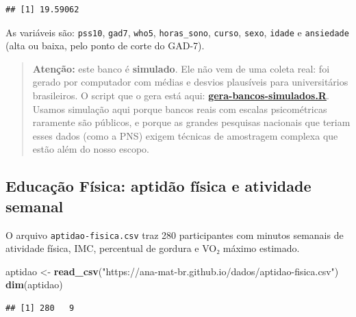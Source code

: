 \documentclass[
]{book}
\newenvironment{Shaded}{\begin{snugshade}}{\end{snugshade}}
\newcommand{\CommentTok}[1]{\textcolor[rgb]{0.56,0.35,0.01}{\textit{#1}}}
\newcommand{\FunctionTok}[1]{\textcolor[rgb]{0.13,0.29,0.53}{\textbf{#1}}}
\newcommand{\NormalTok}[1]{#1}
\newcommand{\OtherTok}[1]{\textcolor[rgb]{0.56,0.35,0.01}{#1}}
\newcommand{\SpecialCharTok}[1]{\textcolor[rgb]{0.81,0.36,0.00}{\textbf{#1}}}
\newcommand{\StringTok}[1]{\textcolor[rgb]{0.31,0.60,0.02}{#1}}
\begin{document}
\begin{verbatim}
## [1] 19.59062
\end{verbatim}

As variáveis são: \texttt{pss10}, \texttt{gad7}, \texttt{who5}, \texttt{horas\_sono}, \texttt{curso}, \texttt{sexo}, \texttt{idade} e \texttt{ansiedade} (alta ou baixa, pelo ponto de corte do GAD-7).

\begin{quote}
\textbf{Atenção:} este banco é \textbf{simulado}. Ele não vem de uma coleta real: foi gerado por computador com médias e desvios plausíveis para universitários brasileiros. O script que o gera está aqui: \href{https://ana-mat-br.github.io/scripts/gera-bancos-simulados.R}{\textbf{gera-bancos-simulados.R}}. Usamos simulação aqui porque bancos reais com escalas psicométricas raramente são públicos, e porque as grandes pesquisas nacionais que teriam esses dados (como a PNS) exigem técnicas de amostragem complexa que estão além do nosso escopo.
\end{quote}

\subsection{Educação Física: aptidão física e atividade semanal}\label{educauxe7uxe3o-fuxedsica-aptiduxe3o-fuxedsica-e-atividade-semanal}

O arquivo \texttt{aptidao-fisica.csv} traz 280 participantes com minutos semanais de atividade física, IMC, percentual de gordura e VO₂ máximo estimado.

\begin{Shaded}
\begin{Highlighting}[]
\NormalTok{aptidao }\OtherTok{\textless{}{-}} \FunctionTok{read\_csv}\NormalTok{(}\StringTok{"https://ana{-}mat{-}br.github.io/dados/aptidao{-}fisica.csv"}\NormalTok{)}
\FunctionTok{dim}\NormalTok{(aptidao)}
\end{Highlighting}
\end{Shaded}

\begin{verbatim}
## [1] 280   9
\end{verbatim}

\begin{Shaded}
\end{Shaded}
\end{document}
